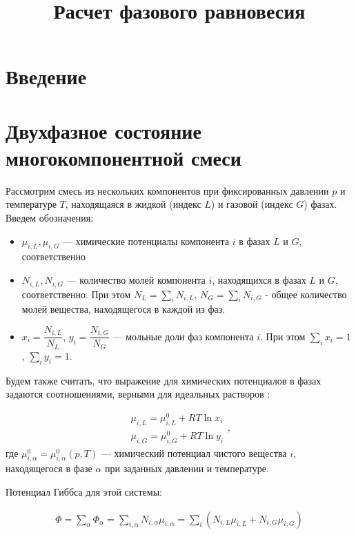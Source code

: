 \documentclass[12pt]{article}
\title{Расчет фазового равновесия}
\begin{document}
\maketitle

\section{Введение}


\section{Двухфазное состояние многокомпонентной смеси}
Рассмотрим смесь из нескольких компонентов при фиксированных давлении $p$ и температуре $T$, находящаяся в жидкой (индекс $L$) и газовой (индекс $G$) фазах. Введем обозначения:
\begin{itemize}
\item $\mu_{i,L}, \mu_{i,G}$ --- химические потенциалы компонента $i$ в фазах $L$ и $G$, соответственно
\item $N_{i,L}, N_{i,G}$ --- количество молей компонента $i$, находящихся в фазах $L$ и $G$, соответственно. При этом $N_L = \sum_i N_{i,L}$, $N_G = \sum_i N_{i,G}$ - общее количество молей вещества, находящегося в каждой из фаз.
\item $x_i = \dfrac{N_{i, L}}{N_L}$, $y_i = \dfrac{N_{i,G}}{N_G}$ --- мольные доли фаз компонента $i$. При этом $ \displaystyle \sum_i x_i = 1 $, $\displaystyle \sum_i y_i = 1 $.
\end{itemize}

Будем также считать, что выражение для химических потенциалов в фазах задаются соотношениями, верными для идеальных растворов \cite{Prigozhin}:

\begin{equation}
\begin{aligned}
\mu_{i,L} = \mu_{i,L}^0 + RT \ln x_i \\
\mu_{i,G} = \mu_{i,G}^0 + RT \ln y_i
\end{aligned},
\label{eq:hid}
\end{equation}
где $\mu_{i,\alpha}^0 = \mu_{i,\alpha}^0(p, T)$ --- химический потенциал чистого вещества $i$, находящегося в фазе $\alpha$ при заданных давлении и температуре.

Потенциал Гиббса для этой системы:

\begin{equation}
\begin{aligned}
\Phi = \sum_\alpha \Phi_\alpha = \sum_{i, \alpha}{N_{i,\alpha} \mu_{i,\alpha}} = \sum_i \left(N_{i, L} \mu_{i, L} + N_{i, G} \mu_{i, G}\right)
\end{aligned}
\label{eq:gibbs}
\end{equation}
\end{document}
